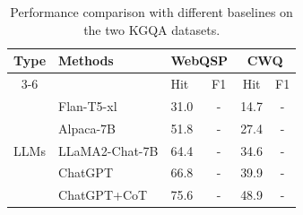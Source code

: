 \documentclass[11pt]{article}
\newcommand{\jt}[1]{{\color{red}[JT:#1]}}
\newcommand{\kai}[1]{{\color{blue}[Kai:#1]}}
\begin{document}


\begin{table}[ht]
    \centering
    \caption{Performance comparison with different baselines on the two KGQA datasets.}
    \label{tab: all_results}
\begin{tabular}{c|llccc}
\hline
\multirow{2}{*}{Type} & \multirow{2}{*}{Methods} & \multicolumn{2}{c}{WebQSP} & \multicolumn{2}{c}{CWQ} \\ \cline{3-6} 
 &  & Hit & F1 & Hit & F1 \\ \hline
\multirow{5}{*}{LLMs} & Flan-T5-xl\citep{chung2024scaling} & 31.0 & - & 14.7 & - \\
 & Alpaca-7B\citep{taori2023stanford} & 51.8 & - & 27.4 & - \\
 & LLaMA2-Chat-7B\citep{touvron2023llama} & 64.4 & - & 34.6 & - \\
 & ChatGPT & 66.8 & - & 39.9 & - \\
 & ChatGPT+CoT & 75.6 & - & 48.9 & - \\ \hline

\end{tabular}
\end{table}
\end{document}
